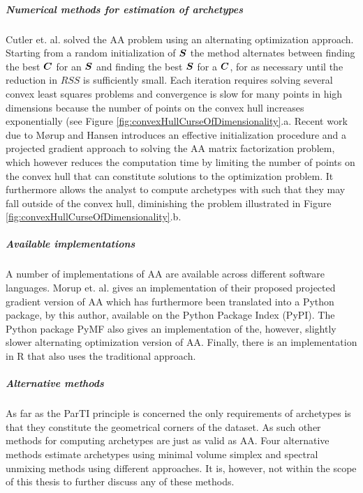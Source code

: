 \subparagraph*{Numerical methods for estimation of archetypes}
Cutler et. al. solved the AA problem using an alternating optimization approach. Starting from a random initialization of $\bm{S}$ the method alternates between finding the best $\bm{C}$ for an $\bm{S}$ and finding the best $\bm{S}$ for a $\bm{C}$, for as necessary until the reduction in $RSS$ is sufficiently small. Each iteration requires solving several convex least squares problems and convergence is slow for many points in high dimensions because the number of points on the convex hull increases exponentially (see Figure \ref{fig:convexHullCurseOfDimensionality}.a. Recent work due to M\o rup and Hansen introduces an effective initialization procedure and a projected gradient approach to solving the AA matrix factorization problem, which however reduces the computation time by limiting the number of points on the convex hull that can constitute solutions to the optimization problem. It furthermore allows the analyst to compute archetypes with  such that they may fall outside of the convex hull, diminishing the problem illustrated in Figure \ref{fig:convexHullCurseOfDimensionality}.b.


\subparagraph*{Available implementations}
A number of implementations of AA are available across different software languages. Morup et. al. gives an implementation of their proposed projected gradient version of AA which has furthermore been translated into a Python package, by this author, available on the Python Package Index (PyPI). The Python package PyMF also gives an implementation of the, however, slightly slower alternating optimization version of AA. Finally, there is an implementation in R that also uses the traditional approach.

\subparagraph*{Alternative methods}
As far as the ParTI principle is concerned the only requirements of archetypes is that they constitute the geometrical corners of the dataset. As such other methods for computing archetypes are just as valid as AA. Four alternative methods estimate archetypes using minimal volume simplex and spectral unmixing methods using different approaches. It is, however, not within the scope of this thesis to further discuss any of these methods.